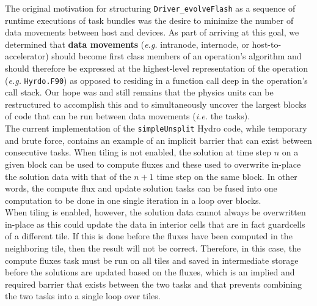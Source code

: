 \documentclass{article}
\begin{document}
The original motivation for structuring \texttt{Driver\_evolveFlash} as a
sequence of runtime executions of task bundles was the desire to minimize the
number of data movements between host and devices.  As part of arriving at this
goal, we determined that \textbf{data movements} (\textit{e.g.} intranode,
internode, or host-to-accelerator) should become first class members of an
operation's algorithm and should therefore be expressed at the highest-level
representation of the operation (\textit{e.g.} \texttt{Hyrdo.F90}) as opposed
to residing in a function call deep in the operation's call stack.  Our hope was and still
remains that the physics units can be restructured to accomplish this and to
simultaneously uncover the largest blocks of code that can be run between data
movements (\textit{i.e.} the tasks).\\

The current implementation of the \texttt{simpleUnsplit} Hydro code, while temporary and
brute force, contains an example of an implicit barrier that can exist between
consecutive tasks.  When tiling is not enabled, the solution at time step $n$ on
a given block can be used to compute fluxes and these used to overwrite in-place
the solution data with that of the $n+1$ time step on the same block.  In other
words, the compute flux and update solution tasks can be fused into one
computation to be done in one single iteration in a loop over blocks.\\

When tiling is enabled, however, the solution data cannot always be overwritten
in-place as this could update the data in interior cells that are in fact
guardcells of a different tile.  If this is done before the fluxes have been
computed in the neighboring tile, then the result will not be correct.
Therefore, in this case, the compute fluxes task must be run on all tiles and
saved in intermediate storage before the solutions are updated based on the
fluxes, which is an implied and required barrier that exists between
the two tasks and that prevents combining the two tasks into a single loop over
tiles.\\

\end{document}
